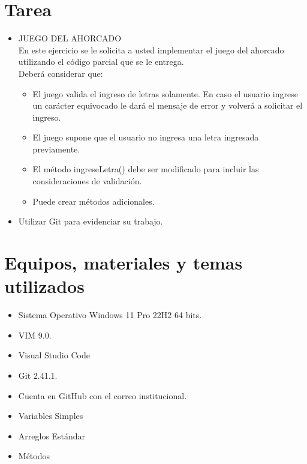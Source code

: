 \documentclass{article}
\begin{document}

	\section{Tarea}
	\begin{itemize}		
		\item JUEGO DEL AHORCADO \\
        En este ejercicio se le solicita a usted implementar el juego del ahorcado utilizando el código parcial que se le entrega. \\
        Deberá considerar que:
        \begin{itemize}
            \item El juego valida el ingreso de letras solamente. En caso el usuario ingrese un carácter equivocado le dará el mensaje de error y volverá a solicitar el ingreso.
            \item El juego supone que el usuario no ingresa una letra ingresada previamente.
            \item El método ingreseLetra() debe ser modificado para incluir las consideraciones de validación.
            \item Puede crear métodos adicionales.
        \end{itemize}
        
		\item Utilizar Git para evidenciar su trabajo.

	\end{itemize}
		
	\section{Equipos, materiales y temas utilizados}
	\begin{itemize}
		\item Sistema Operativo Windows 11 Pro 22H2 64 bits.
		\item VIM 9.0.
		\item Visual Studio Code
		\item Git 2.41.1.
		\item Cuenta en GitHub con el correo institucional.
            \item Variables Simples
		\item Arreglos Estándar
        \item Métodos
	\end{itemize}
	
\end{document}
